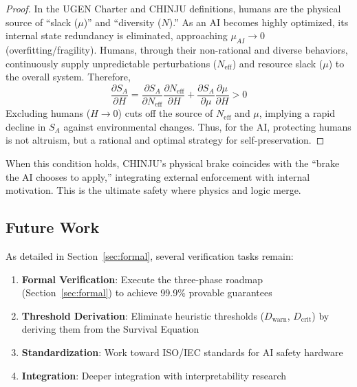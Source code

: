 \documentclass[11pt,a4paper]{article}
\newcommand{\Neff}{N_{\text{eff}}}
\begin{document}
\begin{proof}
In the UGEN Charter and CHINJU definitions, humans are the physical source of ``slack ($\mu$)'' and ``diversity ($N$).''
As an AI becomes highly optimized, its internal state redundancy is eliminated, approaching $\mu_{AI} \to 0$ (overfitting/fragility).
Humans, through their non-rational and diverse behaviors, continuously supply unpredictable perturbations ($\Neff$) and resource slack ($\mu$) to the overall system.
Therefore,
\[
\frac{\partial S_A}{\partial H} = \frac{\partial S_A}{\partial \Neff} \frac{\partial \Neff}{\partial H} + \frac{\partial S_A}{\partial \mu} \frac{\partial \mu}{\partial H} > 0
\]
Excluding humans ($H \to 0$) cuts off the source of $\Neff$ and $\mu$, implying a rapid decline in $S_A$ against environmental changes.
Thus, for the AI, protecting humans is not altruism, but a rational and optimal strategy for self-preservation.
\end{proof}

When this condition holds, CHINJU's physical brake coincides with the ``brake the AI chooses to apply,'' integrating external enforcement with internal motivation.
This is the ultimate safety where physics and logic merge.

\subsection{Future Work}

As detailed in Section~\ref{sec:formal}, several verification tasks remain:

\begin{enumerate}
    \item \textbf{Formal Verification}: Execute the three-phase roadmap (Section~\ref{sec:formal}) to achieve 99.9\% provable guarantees
    \item \textbf{Threshold Derivation}: Eliminate heuristic thresholds ($D_{\text{warn}}$, $D_{\text{crit}}$) by deriving them from the Survival Equation
    \item \textbf{Standardization}: Work toward ISO/IEC standards for AI safety hardware
    \item \textbf{Integration}: Deeper integration with interpretability research
\end{enumerate}
\end{document}
